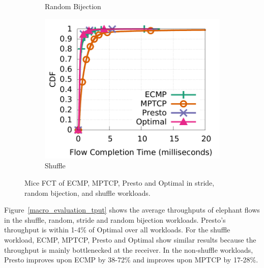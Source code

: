 \begin{figure}[!t]
\begin{subfigure}[b]{0.45\textwidth}
        	\caption{Random Bijection}
        	\label{macro_evaluation_fct_bijection}
	\end{subfigure}
        \begin{subfigure}[b]{0.45\textwidth}
                \centering
		\includegraphics[width=\textwidth]{presto/figures/macro/shuffle/macro_compare_fct_shuffle_mice.pdf}
        	\caption{Shuffle}
        	\label{macro_evaluation_fct_shuffle}
	\end{subfigure}
	\caption{Mice FCT of ECMP, MPTCP, Presto and Optimal in stride, random bijection, and shuffle workloads.}
	\label{macro_evaluation_fct}
\end{figure}

Figure~\ref{macro_evaluation_tput} 
shows the average throughputs of elephant flows in the shuffle, random, stride and random bijection workloads.
Presto's throughput is within 1-4\% of Optimal over all workloads.
For the shuffle workload, ECMP, MPTCP, Presto and Optimal show similar results 
because the throughput is mainly bottlenecked at the receiver. 
In the non-shuffle workloads, Presto improves upon ECMP by 38-72\% and improves
upon MPTCP by 17-28\%.


